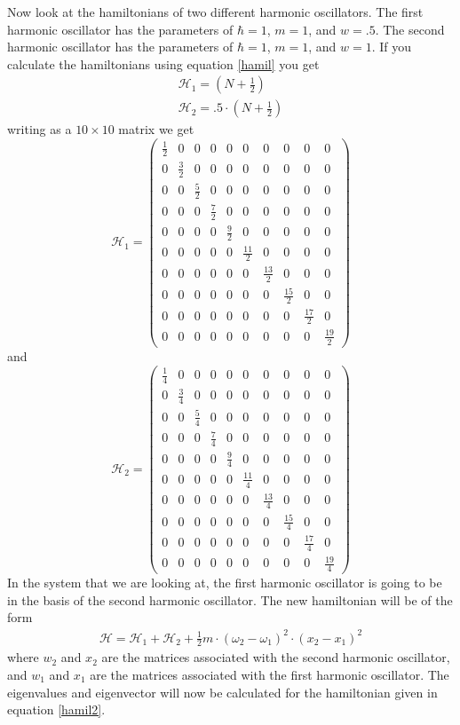 \documentclass[12pt]{article}
\begin{document}
Now look at the hamiltonians of two different harmonic oscillators. The first harmonic oscillator has the parameters of $\hbar = 1$, $m = 1$, and $w=.5$. The second harmonic oscillator has the parameters of $\hbar = 1$, $m = 1$, and $w=1$. If you calculate the hamiltonians using equation \ref{hamil} you get
\begin{gather}
\mathcal{H}_1 =  (N + \frac{1}{2}) \\
\mathcal{H}_2 =  .5 \cdot(N + \frac{1}{2})
\end{gather}
writing as a $10\times10$ matrix we get
\[ \mathcal{H}_1 = \left( \begin{array}{cccccccccc}
\frac{1}{2} & 0 & 0 & 0 & 0 & 0 & 0 & 0 & 0 & 0\\
0 & \frac{3}{2} & 0 & 0 & 0 & 0 & 0 & 0 & 0 & 0\\
0 & 0 & \frac{5}{2} & 0 & 0 & 0 & 0 & 0 & 0 & 0\\
0 & 0 & 0 & \frac{7}{2} & 0 & 0 & 0 & 0 & 0 & 0\\
0 & 0 & 0 & 0 & \frac{9}{2} & 0 & 0 & 0 & 0 & 0\\
0 & 0 & 0 & 0 & 0 & \frac{11}{2} & 0 & 0 & 0 & 0\\
0 & 0 & 0 & 0 & 0 & 0 & \frac{13}{2} & 0 & 0 & 0\\
0 & 0 & 0 & 0 & 0 & 0 & 0 & \frac{15}{2} & 0 & 0\\
0 & 0 & 0 & 0 & 0 & 0 & 0 & 0 & \frac{17}{2} & 0\\
0 & 0 & 0 & 0 & 0 & 0 & 0 & 0 & 0 & \frac{19}{2} \end{array} \right)\]
and
\[ \mathcal{H}_2 = \left( \begin{array}{cccccccccc}
\frac{1}{4} & 0 & 0 & 0 & 0 & 0 & 0 & 0 & 0 & 0\\
0 & \frac{3}{4} & 0 & 0 & 0 & 0 & 0 & 0 & 0 & 0\\
0 & 0 & \frac{5}{4} & 0 & 0 & 0 & 0 & 0 & 0 & 0\\
0 & 0 & 0 & \frac{7}{4} & 0 & 0 & 0 & 0 & 0 & 0\\
0 & 0 & 0 & 0 & \frac{9}{4} & 0 & 0 & 0 & 0 & 0\\
0 & 0 & 0 & 0 & 0 & \frac{11}{4} & 0 & 0 & 0 & 0\\
0 & 0 & 0 & 0 & 0 & 0 & \frac{13}{4} & 0 & 0 & 0\\
0 & 0 & 0 & 0 & 0 & 0 & 0 & \frac{15}{4} & 0 & 0\\
0 & 0 & 0 & 0 & 0 & 0 & 0 & 0 & \frac{17}{4} & 0\\
0 & 0 & 0 & 0 & 0 & 0 & 0 & 0 & 0 & \frac{19}{4} \end{array} \right)\]
In the system that we are looking at, the first harmonic oscillator is going to be in the basis of the second harmonic oscillator. The new hamiltonian will be of the form 
\begin{gather}
\mathcal{H} =   \mathcal{H}_1 + \mathcal{H}_2 + \frac{1}{2} m \cdot (\omega_2-\omega_1)^2 \cdot (x_2-x_1)^2
\label{hamil2}
\end{gather}
where $w_2$ and $x_2$ are the matrices associated with the second harmonic oscillator, and $w_1$ and $x_1$ are the matrices associated with the first harmonic oscillator. The eigenvalues and eigenvector will now be calculated for the hamiltonian given in equation \ref{hamil2}.
\end{document}
